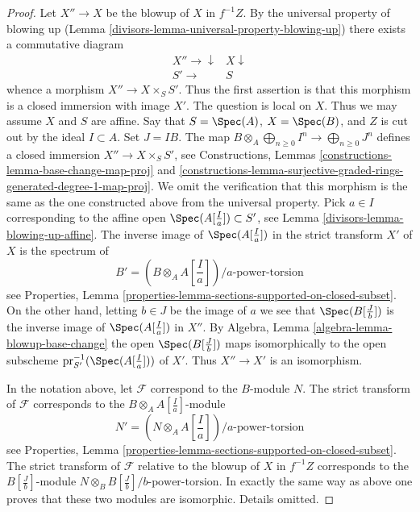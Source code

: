 \begin{proof}

Let $X'' \to X$ be the blowup of $X$ in $f^{-1}Z$. By the universal
property of blowing up (Lemma \ref{divisors-lemma-universal-property-blowing-up})
there exists a commutative diagram
$$
\begin{array}{cc}X'' \longrightarrow\downarrow & X \downarrow \\ S' \longrightarrow & S\end{array}
$$
whence a morphism $X'' \to X \times_S S'$. Thus the first assertion
is that this morphism is a closed immersion with image $X'$.
The question is local on $X$. Thus we may assume $X$
and $S$ are affine. Say that $S = \Spec(A)$, $X = \Spec(B)$, and $Z$
is cut out by the ideal $I \subset A$. Set $J = IB$. The map
$B \otimes_A \bigoplus_{n \geq 0} I^n \to \bigoplus_{n \geq 0} J^n$
defines a closed immersion $X'' \to X \times_S S'$, see
Constructions, Lemmas
\ref{constructions-lemma-base-change-map-proj} and
\ref{constructions-lemma-surjective-graded-rings-generated-degree-1-map-proj}.
We omit the verification that this morphism is the same as the
one constructed above from the universal property.
Pick $a \in I$ corresponding to the affine open
$\Spec(A[\frac{I}{a}]) \subset S'$, see Lemma \ref{divisors-lemma-blowing-up-affine}.
The inverse image of $\Spec(A[\frac{I}{a}])$ in the strict transform
$X'$ of $X$ is the spectrum of
$$
B' = (B \otimes_A A[\textstyle{\frac{I}{a}}])/a\text{-power-torsion}
$$
see Properties, Lemma
\ref{properties-lemma-sections-supported-on-closed-subset}.
On the other hand, letting $b \in J$ be the image of $a$ we see that
$\Spec(B[\frac{J}{b}])$ is the inverse image of $\Spec(A[\frac{I}{a}])$
in $X''$. By Algebra, Lemma \ref{algebra-lemma-blowup-base-change}
the open $\Spec(B[\frac{J}{b}])$ maps isomorphically to the open subscheme
$\text{pr}_{S'}^{-1}(\Spec(A[\frac{I}{a}]))$ of $X'$.
Thus $X'' \to X'$ is an isomorphism.

\medskip\noindent
In the notation above, let $\mathcal{F}$ correspond to the $B$-module $N$.
The strict transform of $\mathcal{F}$ corresponds to the
$B \otimes_A A[\frac{I}{a}]$-module
$$
N' = (N \otimes_A A[\textstyle{\frac{I}{a}}])/a\text{-power-torsion}
$$
see Properties, Lemma
\ref{properties-lemma-sections-supported-on-closed-subset}.
The strict transform of $\mathcal{F}$ relative to the blowup of
$X$ in $f^{-1}Z$ corresponds to the $B[\frac{J}{b}]$-module
$N \otimes_B B[\frac{J}{b}]/b\text{-power-torsion}$. In exactly the same
way as above one proves that these two modules are isomorphic.
Details omitted.
\end{proof}

